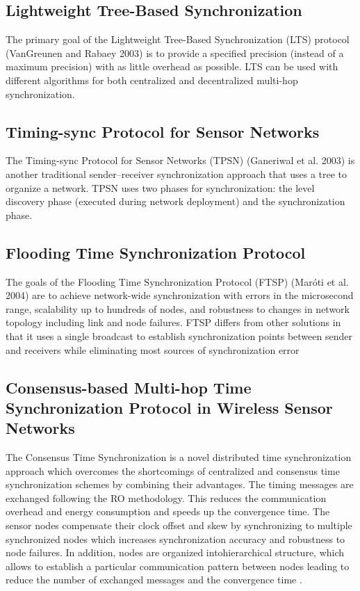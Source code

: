\subsection{Lightweight Tree-Based Synchronization}
The primary goal of the Lightweight Tree-Based Synchronization (LTS) protocol (VanGreunen and Rabaey 2003) is to provide a specified precision (instead of a maximum precision) with as little overhead as possible. LTS can be used with different algorithms for both centralized and decentralized multi-hop synchronization.

\subsection{Timing-sync Protocol for Sensor Networks}
The Timing-sync Protocol for Sensor Networks (TPSN) (Ganeriwal et al. 2003) is another traditional sender–receiver synchronization approach that uses a tree to organize a network. TPSN uses two phases for synchronization: the level discovery phase (executed
during network deployment) and the synchronization phase.
\subsection{Flooding Time Synchronization Protocol}
The goals of the Flooding Time Synchronization Protocol (FTSP) (Maróti et al. 2004) are
to achieve network-wide synchronization with errors in the microsecond range, scalability
up to hundreds of nodes, and robustness to changes in network topology including link
and node failures. FTSP differs from other solutions in that it uses a single broadcast
to establish synchronization points between sender and receivers while eliminating most
sources of synchronization error
\subsection{Consensus-based Multi-hop Time	Synchronization Protocol in Wireless Sensor	Networks}
The Consensus Time Synchronization \cite{sync2} is a novel distributed time synchronization approach which overcomes the shortcomings of centralized and consensus time synchronization schemes by combining their advantages. The timing messages are exchanged following the RO methodology. This reduces the communication overhead and energy consumption and speeds up the convergence time. The sensor nodes compensate their clock offset and skew by synchronizing to multiple synchronized nodes which increases synchronization accuracy and robustness to node failures. In addition, nodes are organized intohierarchical structure, which allows to establish a particular communication pattern between nodes leading to reduce the number of exchanged messages and the convergence time .



